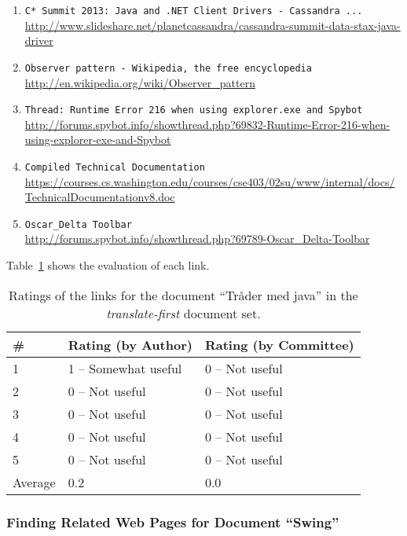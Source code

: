 \begin{enumerate}
\item
    \verb|C* Summit 2013: Java and .NET Client Drivers - Cassandra ...| \\
    \url{http://www.slideshare.net/planetcassandra/cassandra-summit-data-stax-java-driver}
\item
    \verb|Observer pattern - Wikipedia, the free encyclopedia| \\
    \url{http://en.wikipedia.org/wiki/Observer_pattern}
\item
    \verb|Thread: Runtime Error 216 when using explorer.exe and Spybot| \\
    \url{http://forums.spybot.info/showthread.php?69832-Runtime-Error-216-when-using-explorer-exe-and-Spybot}
\item
    \verb|Compiled Technical Documentation| \\
    \url{https://courses.cs.washington.edu/courses/cse403/02su/www/internal/docs/TechnicalDocumentationv8.doc}
\item
    \verb|Oscar_Delta Toolbar| \\
    \url{http://forums.spybot.info/showthread.php?69789-Oscar_Delta-Toolbar}
\end{enumerate}

Table~\ref{tab:ratings-en-tr-der-med-java-2} shows the evaluation of each link.
\begin{table}[H]
\centering
\begin{tabular}{|l|l|l|}
\hline\hline
    \# & Rating (by Author) & Rating (by Committee) \\
\hline
    1 & 1 -- Somewhat useful & 0 -- Not useful \\
    2 & 0 -- Not useful & 0 -- Not useful \\
    3 & 0 -- Not useful & 0 -- Not useful \\
    4 & 0 -- Not useful & 0 -- Not useful \\
    5 & 0 -- Not useful & 0 -- Not useful \\
\hline
    Average & 0.2 & 0.0 \\
\hline\hline
\end{tabular}
\caption{Ratings of the links for the document ``Tråder med java'' in the \textit{translate-first} document set.}
\label{tab:ratings-en-tr-der-med-java-2}
\end{table}


\subsubsection{Finding Related Web Pages for Document ``Swing''}
\label{subsubsec:no-swing-2}

